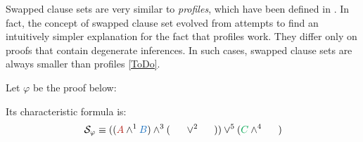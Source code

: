 \begin{remark}
Swapped clause sets are very similar to \emph{profiles}, which have been defined in \cite{Hetzl2007CharacteristicClauseSetsandProofTransformations}. In fact, the concept of swapped clause set evolved from attempts to find an intuitively simpler explanation for the fact that profiles work. They differ only on proofs that contain  degenerate inferences. In such cases, swapped clause sets are always smaller than profiles \ref{ToDo}.
\end{remark}



\begin{example}
\label{example:PlusTimesSwapNormalization}
Let $\varphi$ be the proof below:
\begin{prooftree}
		 
	 
						 
					 
					 
									 
								 
\end{prooftree}

\noindent
Its characteristic formula is:
$$
\struct{\varphi} 
\equiv 
((\hA{A} \structplus^1 \hB{B}) \structplus^3 (\hC{\structdual{B}} \structtimes^2 \hD{\structdual{A}}))
\structtimes^5
(\hE{C} \structplus^4 \hF{\structdual{C}})
$$


\end{example}
